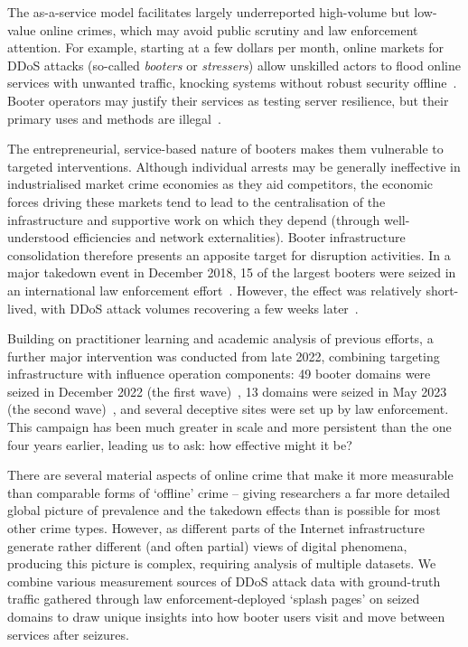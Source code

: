 \documentclass[letterpaper,twocolumn,10pt]{article}
\begin{document}
The as-a-service model facilitates largely underreported high-volume but low-value online crimes, which may avoid public scrutiny and law enforcement attention. For example, starting at a few dollars per month, online markets for DDoS attacks (so-called \textit{booters} or \textit{stressers}) allow unskilled actors to flood online services with unwanted traffic, knocking systems without robust security offline~\cite{hutchings2016exploring}. Booter operators may justify their services as testing server resilience, but their primary uses and methods are illegal~\cite{douglas2017booters}.

The entrepreneurial, service-based nature of booters makes them vulnerable to targeted interventions. Although individual arrests may be generally ineffective in industrialised market crime economies as they aid competitors, the economic forces driving these markets tend to lead to the centralisation of the infrastructure and supportive work on which they depend (through well-understood efficiencies and network externalities). Booter infrastructure consolidation therefore presents an apposite target for disruption activities. In a major takedown event in December 2018, 15 of the largest booters were seized in an international law enforcement effort~\cite{xmasevent2018}. However, the effect was relatively short-lived, with DDoS attack volumes recovering a few weeks later~\cite{collier2019booting, kopp2019ddos}.

Building on practitioner learning and academic analysis of previous efforts, a further major intervention was conducted from late 2022, combining targeting infrastructure with influence operation components: 49 booter domains were seized in December 2022 (the first wave)~\cite{booterseizure2022}, 13 domains were seized in May 2023 (the second wave)~\cite{seized13moredomains}, and several deceptive sites were set up by law enforcement. This campaign has been much greater in scale and more persistent than the one four years earlier, leading us to ask: how effective might it be?

There are several material aspects of online crime that make it more measurable than comparable forms of `offline' crime -- giving researchers a far more detailed global picture of prevalence and the takedown effects than is possible for most other crime types. However, as different parts of the Internet infrastructure generate rather different (and often partial) views of digital phenomena, producing this picture is complex, requiring analysis of multiple datasets. We combine various measurement sources of DDoS attack data with ground-truth traffic gathered through law enforcement-deployed `splash pages' on seized domains to draw unique insights into how booter users visit and move between services after seizures.
\end{document}
